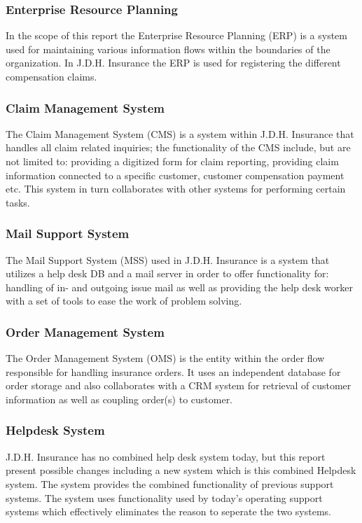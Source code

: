 \subsubsection{Enterprise Resource Planning}
\label{sec:erp}
In the scope of this report the Enterprise Resource Planning (ERP) is a system used for maintaining various information flows within the boundaries of the organization. In J.D.H. Insurance the ERP is used for registering the different compensation claims.      
\subsubsection{Claim Management System}
\label{sec:cms}
The Claim Management System (CMS) is a system within J.D.H. Insurance that handles all claim related inquiries; the functionality of the CMS include, but are not limited to: providing a digitized form for claim reporting, providing claim information connected to a specific customer, customer compensation payment etc. This system in turn collaborates with other systems for performing certain tasks.
\subsubsection{Mail Support System}
\label{sec:mss}
The Mail Support System (MSS) used in J.D.H. Insurance is a system that utilizes a help desk DB and a mail server in order to offer functionality for: handling of in- and outgoing issue mail as well as providing the help desk worker with a set of tools to ease the work of problem solving. 
\subsubsection{Order Management System}
\label{sec:oms}
The Order Management System (OMS) is the entity within the order flow responsible for handling insurance orders. It uses an independent database for order storage and also collaborates with a CRM system for retrieval of customer information as well as coupling order(s) to customer. 
\subsubsection{Helpdesk System}
J.D.H. Insurance has no combined help desk system today, but this report present possible changes including a new system which is this combined Helpdesk system. The system provides the combined functionality of previous support systems. The system uses functionality used by today's operating support systems which effectively eliminates the reason to seperate the two systems. 

